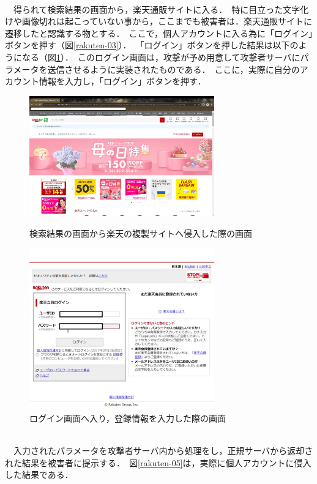 \documentclass[dvipdfmx,twocolumn,9pt]{jsarticle}
\begin{document}
                \\
                　得られて検索結果の画面から，楽天通販サイトに入る．\
                特に目立った文字化けや画像切れは起こっていない事から，ここまでも被害者は．楽天通販サイトに遷移したと認識する物とする．\
                ここで，個人アカウントに入る為に「ログイン」ボタンを押す（図\ref{rakuten-03}）．\
                「ログイン」ボタンを押した結果は以下のようになる（図\ref{rakuten-04}）．\
                このログイン画面は，攻撃が予め用意して攻撃者サーバにパラメータを送信させるように実装されたものである．\
                ここに，実際に自分のアカウント情報を入力し，「ログイン」ボタンを押す．\
                \begin{figure}[h]
                    \centering
                    \includegraphics[width=8cm]{img/rakuten/rakuten-03.png}
                    \caption{検索結果の画面から楽天の複製サイトへ侵入した際の画面}
                    \label{rakuten-03}
                    \includegraphics[width=8cm]{img/rakuten/rakuten-04.png}
                    \caption{ログイン画面へ入り，登録情報を入力した際の画面}
                    \label{rakuten-04}
                \end{figure}
                \\
                　入力されたパラメータを攻撃者サーバ内から処理をし，正規サーバから返却された結果を被害者に提示する．\
                図\ref{rakuten-05}は，実際に個人アカウントに侵入した結果である．\
\end{document}
